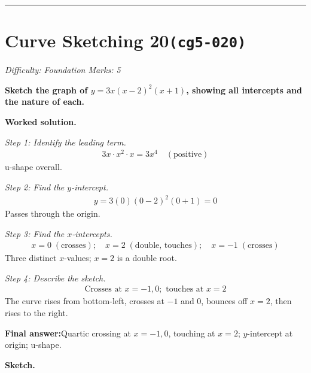 \documentclass[11pt]{article}
\newcommand{\question}[1]{\par\medskip\noindent\textbf{#1}\par}
\begin{document}
\medskip\hrule

\section*{Curve Sketching 20\quad\small\texttt{(cg5-020)}}
\textit{Difficulty: Foundation \quad\textbar\quad Marks: 5}

\question{Sketch the graph of \( y = 3x(x - 2)^2(x + 1) \), showing all intercepts and the nature of each.}

\textbf{Worked solution.}

\textit{Step 1: Identify the leading term.}
\[\begin{gathered}
3x \cdot x^2 \cdot x = 3x^4 \quad (\text{positive})
\end{gathered}\]
u-shape overall.

\textit{Step 2: Find the \( y \)-intercept.}
\[\begin{gathered}
y = 3(0)(0-2)^2(0+1) = 0
\end{gathered}\]
Passes through the origin.

\textit{Step 3: Find the \( x \)-intercepts.}
\[\begin{gathered}
x = 0 \;(\text{crosses}); \quad x = 2 \;(\text{double, touches}); \quad x = -1 \;(\text{crosses})
\end{gathered}\]
Three distinct \( x \)-values; \( x = 2 \) is a double root.

\textit{Step 4: Describe the sketch.}
\[\begin{gathered}
\text{Crosses at } x = -1, 0; \text{ touches at } x = 2
\end{gathered}\]
The curve rises from bottom-left, crosses at \( -1 \) and \( 0 \), bounces off \( x = 2 \), then rises to the right.

\begin{answerbox}
\textbf{Final answer:}\quad Quartic crossing at \(\displaystyle x = -1, 0\), touching at \(\displaystyle x = 2\); \(\displaystyle y\)-intercept at origin; u-shape.
\end{answerbox}
\textbf{Sketch.}
\end{document}
